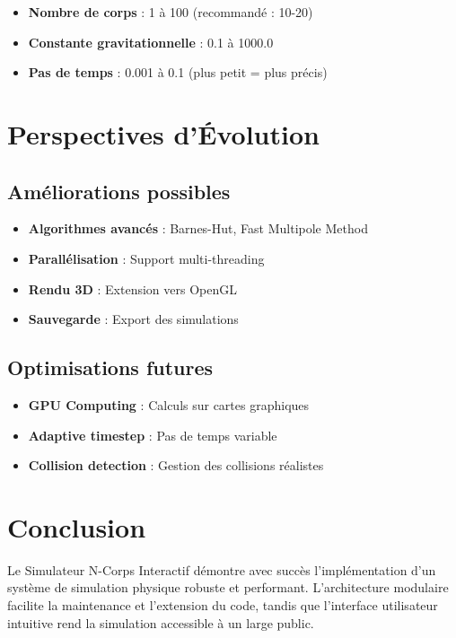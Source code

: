 \documentclass[12pt,a4paper]{article}
\begin{document}
\begin{itemize}
    \item \textbf{Nombre de corps} : 1 à 100 (recommandé : 10-20)
    \item \textbf{Constante gravitationnelle} : 0.1 à 1000.0
    \item \textbf{Pas de temps} : 0.001 à 0.1 (plus petit = plus précis)
\end{itemize}

\section{Perspectives d'Évolution}

\subsection{Améliorations possibles}

\begin{itemize}
    \item \textbf{Algorithmes avancés} : Barnes-Hut, Fast Multipole Method
    \item \textbf{Parallélisation} : Support multi-threading
    \item \textbf{Rendu 3D} : Extension vers OpenGL
    \item \textbf{Sauvegarde} : Export des simulations
\end{itemize}

\subsection{Optimisations futures}

\begin{itemize}
    \item \textbf{GPU Computing} : Calculs sur cartes graphiques
    \item \textbf{Adaptive timestep} : Pas de temps variable
    \item \textbf{Collision detection} : Gestion des collisions réalistes
\end{itemize}

\section{Conclusion}

Le Simulateur N-Corps Interactif démontre avec succès l'implémentation d'un système de simulation physique robuste et performant. L'architecture modulaire facilite la maintenance et l'extension du code, tandis que l'interface utilisateur intuitive rend la simulation accessible à un large public.
\end{document}
